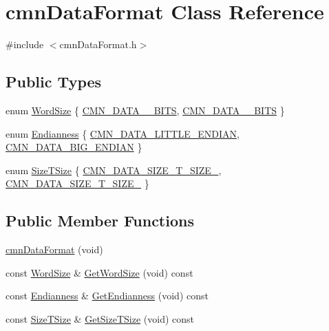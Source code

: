 \hypertarget{classcmn_data_format}{}\section{cmn\+Data\+Format Class Reference}
\label{classcmn_data_format}


{\ttfamily \#include $<$cmn\+Data\+Format.\+h$>$}

\subsection*{Public Types}
\begin{DoxyCompactItemize}
\item 
enum \hyperlink{classcmn_data_format_a897f5e1e8ad8d52f14a856ae67f487f9}{Word\+Size} \{ \hyperlink{classcmn_data_format_a897f5e1e8ad8d52f14a856ae67f487f9a7e089e93b79bd7a5b624002ed92de6a8}{C\+M\+N\+\_\+\+D\+A\+T\+A\+\_\+\_\+\+B\+I\+T\+S}, 
\hyperlink{classcmn_data_format_a897f5e1e8ad8d52f14a856ae67f487f9a8ceb42a89d9dd3fefe9eefc5f50abfa9}{C\+M\+N\+\_\+\+D\+A\+T\+A\+\_\+\_\+\+B\+I\+T\+S}
 \}
\item 
enum \hyperlink{classcmn_data_format_a5716c5b95f7cdbbc81eb2cefd23efed1}{Endianness} \{ \hyperlink{classcmn_data_format_a5716c5b95f7cdbbc81eb2cefd23efed1a4c9405bca6724a43694977b303ff3b96}{C\+M\+N\+\_\+\+D\+A\+T\+A\+\_\+\+L\+I\+T\+T\+L\+E\+\_\+\+E\+N\+D\+I\+A\+N}, 
\hyperlink{classcmn_data_format_a5716c5b95f7cdbbc81eb2cefd23efed1a1f6ea3b537a59b48ef9e1dc247de892c}{C\+M\+N\+\_\+\+D\+A\+T\+A\+\_\+\+B\+I\+G\+\_\+\+E\+N\+D\+I\+A\+N}
 \}
\item 
enum \hyperlink{classcmn_data_format_a9cb91a7a86d6c6078e5566b56d225d07}{Size\+T\+Size} \{ \hyperlink{classcmn_data_format_a9cb91a7a86d6c6078e5566b56d225d07afaf010845c4ab7a08d63921a5dabc7a4}{C\+M\+N\+\_\+\+D\+A\+T\+A\+\_\+\+S\+I\+Z\+E\+\_\+\+T\+\_\+\+S\+I\+Z\+E\+\_}, 
\hyperlink{classcmn_data_format_a9cb91a7a86d6c6078e5566b56d225d07a14e728b3313463dddff17ccf1383192d}{C\+M\+N\+\_\+\+D\+A\+T\+A\+\_\+\+S\+I\+Z\+E\+\_\+\+T\+\_\+\+S\+I\+Z\+E\+\_}
 \}
\end{DoxyCompactItemize}
\subsection*{Public Member Functions}
\begin{DoxyCompactItemize}
\item 
\hyperlink{classcmn_data_format_a7b631ddffe4a2c6919e6b54f378e5f0f}{cmn\+Data\+Format} (void)
\item 
const \hyperlink{classcmn_data_format_a897f5e1e8ad8d52f14a856ae67f487f9}{Word\+Size} \& \hyperlink{classcmn_data_format_ad4cef1d365a5512f7771f1004d0963c1}{Get\+Word\+Size} (void) const 
\item 
const \hyperlink{classcmn_data_format_a5716c5b95f7cdbbc81eb2cefd23efed1}{Endianness} \& \hyperlink{classcmn_data_format_aa0de59ff5675c333e603d79ca618317b}{Get\+Endianness} (void) const 
\item 
const \hyperlink{classcmn_data_format_a9cb91a7a86d6c6078e5566b56d225d07}{Size\+T\+Size} \& \hyperlink{classcmn_data_format_ad71f90cb29b5aaa9a5db549e1c699e3b}{Get\+Size\+T\+Size} (void) const 
\end{DoxyCompactItemize}
